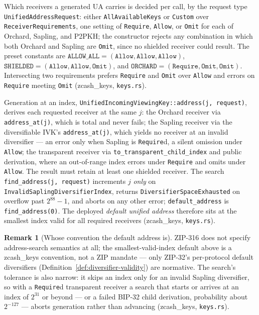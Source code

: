 \documentclass[11pt,a4paper]{article}
\theoremstyle{definition}
\newtheorem{remark}[theorem]{Remark}
\begin{document}
Which receivers a generated UA carries is decided per call, by the
request type \texttt{UnifiedAddressRequest}: either
\texttt{AllAvailableKeys} or
\texttt{Custom} over \texttt{ReceiverRequirements}, one setting of
\texttt{Require}, \texttt{Allow}, or \texttt{Omit} for each of Orchard,
Sapling, and P2PKH; the constructor rejects any combination in which both
Orchard and Sapling are \texttt{Omit}, since no shielded receiver could
result. The preset constants are
$\texttt{ALLOW\_ALL} = (\texttt{Allow},\texttt{Allow},\texttt{Allow})$,
$\texttt{SHIELDED} = (\texttt{Allow},\texttt{Allow},\texttt{Omit})$, and
$\texttt{ORCHARD} = (\texttt{Require},\texttt{Omit},\texttt{Omit})$.
Intersecting two
requirements prefers \texttt{Require} and \texttt{Omit} over
\texttt{Allow} and errors on \texttt{Require} meeting \texttt{Omit}
(\textsf{zcash\_keys}, \texttt{keys.rs}).

Generation at an index,
\texttt{UnifiedIncomingViewingKey::address(j, request)}, derives each
requested receiver at the same $j$: the Orchard receiver via
\texttt{address\_at(j)}, which is total and never fails; the Sapling
receiver via the diversifiable IVK's \texttt{address\_at(j)}, which yields
no receiver at an invalid diversifier --- an error only when Sapling is
\texttt{Require}d, a silent omission under \texttt{Allow}; the transparent
receiver via \texttt{to\_transparent\_child\_index} and public derivation,
where an out-of-range index errors under \texttt{Require} and omits under
\texttt{Allow}. The result must retain at least one shielded receiver. The
search \texttt{find\_address(j, request)} increments $j$ \emph{only} on
\texttt{InvalidSaplingDiversifierIndex}, returns
\texttt{DiversifierSpaceExhausted} on overflow past $2^{88}-1$, and aborts
on any other error; \texttt{default\_address} is
\texttt{find\_address(0)}. The deployed \emph{default unified address}
therefore sits at the smallest index valid for all required receivers
(\textsf{zcash\_keys}, \texttt{keys.rs}).

\begin{remark}[Whose convention the default address is]\label{rem:default-ua-convention}
ZIP-316 does not specify address-search semantics at all; the
smallest-valid-index default above is a \textsf{zcash\_keys} convention,
not a ZIP mandate --- only ZIP-32's per-protocol default diversifiers
(Definition~\ref{def:diversifier-validity}) are normative. The search's
tolerance is also narrow: it skips an index only for an invalid Sapling
diversifier, so with a \texttt{Require}d transparent receiver a search
that starts or arrives at an index of $2^{31}$ or beyond --- or a failed
BIP-32 child derivation, probability about $2^{-127}$ --- aborts
generation rather than advancing (\textsf{zcash\_keys},
\texttt{keys.rs}).
\end{remark}
\end{document}
